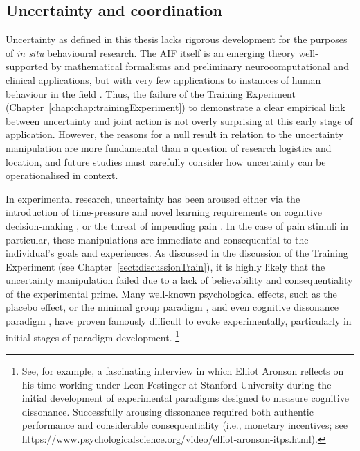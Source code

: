 \subsection{Uncertainty and coordination}
Uncertainty as defined in this thesis lacks rigorous development for the purposes of \textit{in situ} behavioural research.  The AIF itself is an emerging theory well-supported by mathematical formalisms and preliminary neurocomputational and clinical applications, but with very few applications to instances of human behaviour in the field \citep{Clark2013}.  Thus, the failure of the Training Experiment (Chapter~\ref{chap:chap:trainingExperiment}) to demonstrate a clear empirical link between uncertainty and joint action is not overly surprising at this early stage of application.  However, the reasons for a null result in relation to the uncertainty manipulation are more fundamental than a question of research logistics and location, and future studies must carefully consider how uncertainty can be operationalised in context.

In experimental research, uncertainty has been aroused either via the introduction of time-pressure and novel learning requirements on cognitive decision-making \citep[see:][]{Daw2005,Kording2006}, or the threat of impending pain \citep[e.g.,][]{Voigt1990,Moutoussis2014}.  In the case of pain stimuli in particular, these manipulations are immediate and consequential to the individual's goals and experiences.  As discussed in the discussion of the Training Experiment (see Chapter~\ref{sect:discussionTrain}), it is highly likely that the uncertainty manipulation failed due to a lack of believability and consequentiality of the experimental prime.  Many well-known psychological effects, such as the placebo effect, or the minimal group paradigm \citep[586]{Liu2009}, and even cognitive dissonance paradigm \citep{Kenworthy2011}, have proven famously difficult to evoke experimentally, particularly in initial stages of paradigm development. \footnote{See, for example, a fascinating interview in which Elliot Aronson reflects on his time working under Leon Festinger at Stanford University during the initial development of experimental paradigms designed to measure cognitive dissonance.  Successfully arousing dissonance required both authentic performance and considerable consequentiality (i.e., monetary incentives; see https://www.psychologicalscience.org/video/elliot-aronson-itps.html).}

